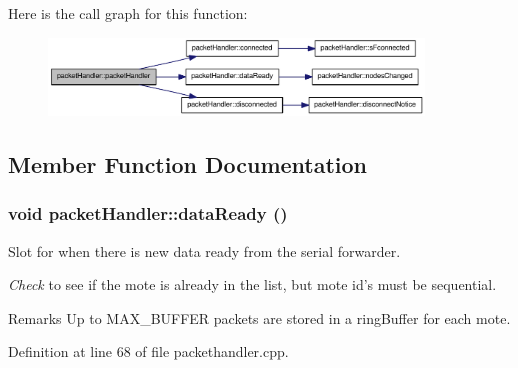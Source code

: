 Here is the call graph for this function:\nopagebreak
\begin{figure}[H]
\begin{center}
\leavevmode
\includegraphics[width=283pt]{classpacketHandler_a02936b9105618ed38701274efcfa0dfb_cgraph}
\end{center}
\end{figure}




\subsection{Member Function Documentation}
\hypertarget{classpacketHandler_a9085a61a51eccc7acb240a7b68601686}{
\subsubsection[{dataReady}]{\setlength{\rightskip}{0pt plus 5cm}void packetHandler::dataReady ()}}
\label{classpacketHandler_a9085a61a51eccc7acb240a7b68601686}


Slot for when there is new data ready from the serial forwarder. 



{\itshape Check\/} to see if the mote is already in the list, but mote id's must be sequential.

\begin{DoxyRemark}{Remarks}
Up to MAX\_\-BUFFER packets are stored in a ringBuffer for each mote. 
\end{DoxyRemark}




Definition at line 68 of file packethandler.cpp.




